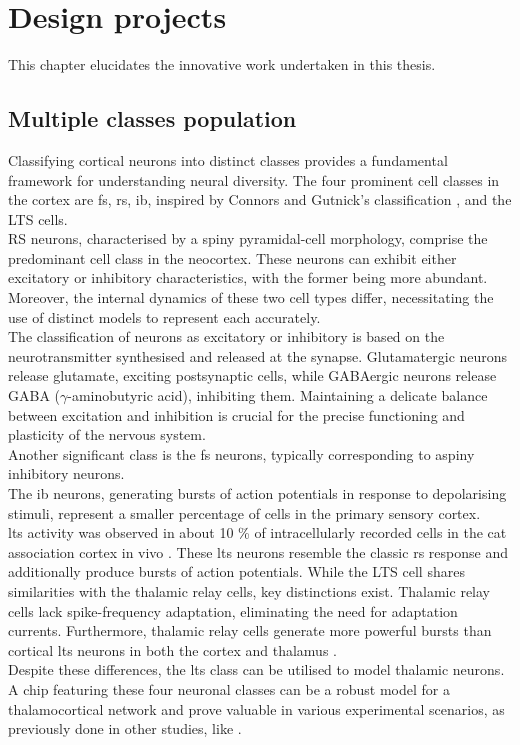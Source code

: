 \chapter{Design projects}
\label{ch5}
This chapter elucidates the innovative work undertaken in this thesis.
\section{Multiple classes population}
Classifying cortical neurons into distinct classes provides a fundamental framework for understanding neural diversity. 
The four prominent cell classes in the cortex are \acrshort{fs}, \acrshort{rs}, 
\acrshort{ib}, inspired by Connors and Gutnick's classification \cite{CONNORS}, 
and the LTS cells.\\

RS neurons, characterised by a spiny pyramidal-cell morphology, comprise the 
predominant cell class in the neocortex. These neurons can exhibit either 
excitatory or inhibitory characteristics, with the former being more abundant. 
Moreover, the internal dynamics of these two cell types differ, necessitating 
the use of distinct models to represent each accurately.\\
The classification of neurons as excitatory or inhibitory is based on the 
neurotransmitter synthesised and released at the synapse. Glutamatergic 
neurons release glutamate, exciting postsynaptic cells, while GABAergic 
neurons release GABA (\(\gamma\)-aminobutyric acid), inhibiting them. 
Maintaining a delicate balance between excitation and inhibition is crucial 
for the precise functioning and plasticity of the nervous system.\\
Another significant class is the \acrshort{fs} neurons, typically 
corresponding to aspiny inhibitory neurons.\\
The \acrshort{ib} neurons, generating bursts of action potentials in response to 
depolarising stimuli, represent a smaller percentage of cells in the primary 
sensory cortex.\\
\acrshort{lts} activity was observed in about 10 \% of intracellularly 
recorded cells in the 
cat association cortex in vivo \cite{DestexheLTS}. These \acrshort{lts} neurons 
resemble the classic \acrshort{rs} response and additionally produce bursts of 
action potentials. While the LTS cell shares similarities with the thalamic relay 
cells, key distinctions exist. Thalamic relay cells lack spike-frequency adaptation, 
eliminating the need for adaptation currents. Furthermore, thalamic relay cells 
generate more powerful bursts than cortical \acrshort{lts} neurons in both the 
cortex and thalamus \cite{Pospischil}.\\
Despite these differences, the \acrshort{lts} class can be utilised to model 
thalamic neurons. A chip featuring these four neuronal classes can be a robust 
model for a thalamocortical network and prove valuable in various experimental 
scenarios, as previously done in other studies, like \cite{Khoyratee}.\\

